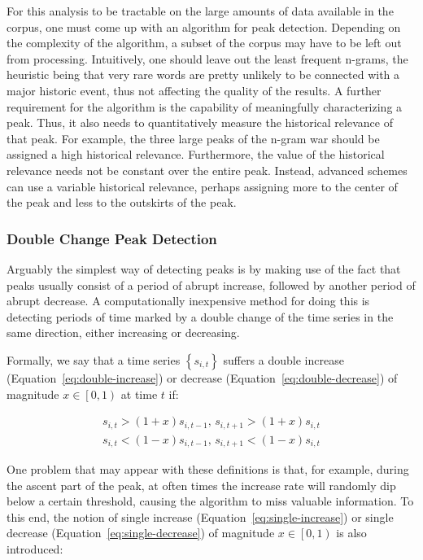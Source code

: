 For this analysis to be tractable on the large amounts of data available in the corpus, one must come up with an algorithm for peak detection. Depending on the complexity of the algorithm, a subset of the corpus may have to be left out from processing. Intuitively, one should leave out the least frequent n-grams, the heuristic being that very rare words are pretty unlikely to be connected with a major historic event, thus not affecting the quality of the results. A further requirement for the algorithm is the capability of meaningfully characterizing a peak. Thus, it also needs to quantitatively measure the historical relevance of that peak. For example, the three large peaks of the n-gram war should be assigned a high historical relevance. Furthermore, the value of the historical relevance needs not be constant over the entire peak. Instead, advanced schemes can use a variable historical relevance, perhaps assigning more to the center of the peak and less to the outskirts of the peak.

\subsubsection{Double Change Peak Detection}

Arguably the simplest way of detecting peaks is by making use of the fact that peaks usually consist of a period of abrupt increase, followed by another period of abrupt decrease. A computationally inexpensive method for doing this is detecting periods of time marked by a double change of the time series in the same direction, either increasing or decreasing.

Formally, we say that a time series $\left\{ s_{i, t} \right\}$ suffers a double increase (Equation~\ref{eq:double-increase}) or decrease (Equation~\ref{eq:double-decrease}) of magnitude $x \in \left[ 0, 1 \right)$ at time $t$ if:

\begin{align}
\label{eq:double-increase}
s_{i, t} > \left( 1 + x \right) s_{i, t - 1}, \, s_{i, t + 1} > \left( 1 + x \right) s_{i, t}
\\
\label{eq:double-decrease}
s_{i, t} < \left( 1 - x \right) s_{i, t - 1}, \, s_{i, t + 1} < \left( 1 - x \right) s_{i, t}
\end{align}

One problem that may appear with these definitions is that, for example, during the ascent part of the peak, at often times the increase rate will randomly dip below a certain threshold, causing the algorithm to miss valuable information. To this end, the notion of single increase (Equation~\ref{eq:single-increase}) or single decrease (Equation~\ref{eq:single-decrease}) of magnitude $x \in \left[ 0, 1 \right)$ is also introduced:

